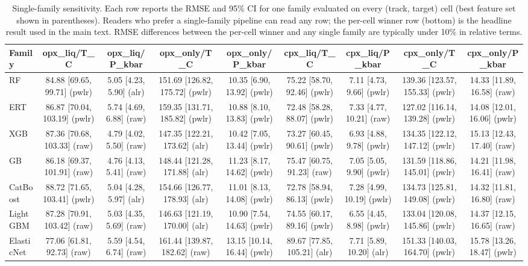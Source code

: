 \begin{table}[h]
\centering
\caption{Single-family sensitivity. Each row reports the RMSE and 95\% CI for one family evaluated on every (track, target) cell (best feature set shown in parentheses). Readers who prefer a single-family pipeline can read any row; the per-cell winner row (bottom) is the headline result used in the main text. RMSE differences between the per-cell winner and any single family are typically under 10\% in relative terms.}
\label{tab:S15_single_family_sensitivity}
\begin{tabular}{lcccccccc}
\toprule
Family & opx\_liq/T\_C & opx\_liq/P\_kbar & opx\_only/T\_C & opx\_only/P\_kbar & cpx\_liq/T\_C & cpx\_liq/P\_kbar & cpx\_only/T\_C & cpx\_only/P\_kbar \\
\midrule
RF & 84.88 [69.65, 99.71] (pwlr) & 5.05 [4.23, 5.90] (alr) & 151.69 [126.82, 175.72] (pwlr) & 10.35 [6.90, 13.92] (pwlr) & 75.22 [58.70, 92.46] (pwlr) & 7.11 [4.73, 9.66] (pwlr) & 139.36 [123.57, 155.33] (pwlr) & 14.33 [11.89, 16.58] (raw) \\
ERT & 86.87 [70.04, 103.19] (pwlr) & 5.74 [4.69, 6.88] (raw) & 159.35 [131.71, 185.82] (pwlr) & 10.88 [8.10, 13.83] (pwlr) & 72.48 [58.28, 88.07] (pwlr) & 7.33 [4.77, 10.21] (raw) & 127.02 [116.14, 139.28] (pwlr) & 14.08 [12.01, 16.06] (pwlr) \\
XGB & 87.36 [70.68, 103.33] (raw) & 4.79 [4.02, 5.50] (raw) & 147.35 [122.21, 173.62] (alr) & 10.42 [7.05, 13.44] (pwlr) & 73.27 [60.45, 90.61] (pwlr) & 6.93 [4.88, 9.78] (pwlr) & 134.35 [122.12, 147.12] (pwlr) & 15.13 [12.43, 17.40] (raw) \\
GB & 86.18 [69.37, 101.91] (raw) & 4.76 [4.13, 5.41] (raw) & 148.44 [121.28, 171.88] (alr) & 11.23 [8.17, 14.62] (pwlr) & 75.47 [60.75, 91.23] (raw) & 7.05 [5.05, 9.90] (pwlr) & 131.59 [118.86, 145.01] (pwlr) & 14.21 [11.98, 16.41] (raw) \\
CatBoost & 88.72 [71.65, 103.41] (pwlr) & 5.04 [4.28, 5.97] (alr) & 154.66 [126.77, 178.93] (alr) & 11.01 [8.13, 14.08] (pwlr) & 72.78 [58.94, 86.13] (pwlr) & 7.28 [4.99, 10.19] (pwlr) & 134.73 [125.81, 149.08] (pwlr) & 14.32 [11.81, 16.80] (raw) \\
LightGBM & 87.28 [70.91, 103.42] (raw) & 5.03 [4.35, 5.69] (raw) & 146.63 [121.19, 170.00] (alr) & 10.90 [7.54, 14.63] (pwlr) & 74.55 [60.17, 89.16] (pwlr) & 6.55 [4.45, 8.98] (pwlr) & 133.04 [120.08, 145.86] (pwlr) & 14.37 [12.15, 16.65] (raw) \\
ElasticNet & 77.06 [61.81, 92.73] (raw) & 5.59 [4.54, 6.74] (raw) & 161.44 [139.87, 182.62] (raw) & 13.15 [10.14, 16.44] (pwlr) & 89.67 [77.85, 105.21] (alr) & 7.71 [5.89, 10.20] (alr) & 151.33 [140.03, 164.70] (pwlr) & 15.78 [13.26, 18.47] (pwlr) \\

\end{tabular}
\end{table}
